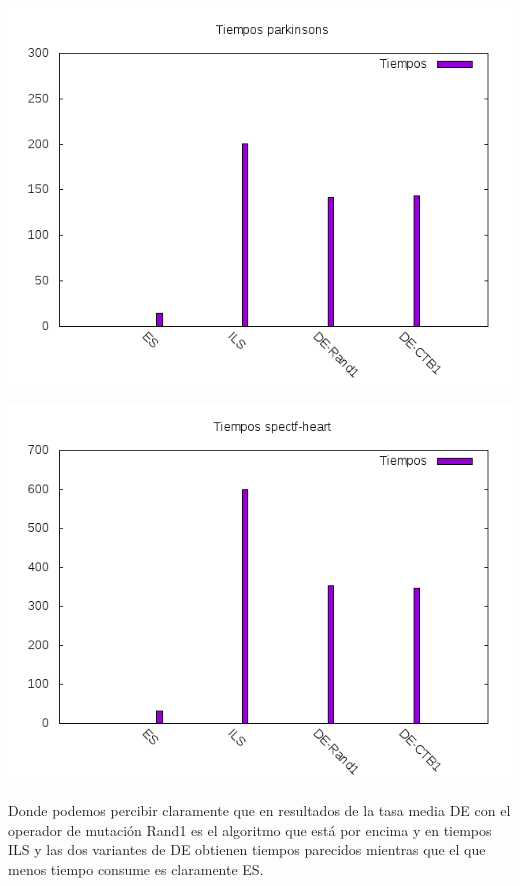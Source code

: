 \documentclass[12pt,a4paper]{article}
\begin{document}
	\includegraphics[scale=0.8]{./Imagenes/Tiempos/tiempos_parkinsons.png}
	
	\includegraphics[scale=0.8]{./Imagenes/Tiempos/tiempos_spectf-heart.png}
	
	Donde podemos percibir claramente que en resultados de la tasa media DE con el operador de mutación Rand1 es el algoritmo que está por encima y en tiempos ILS y las dos variantes de DE obtienen tiempos parecidos mientras que el que menos tiempo consume es claramente ES.
\end{document}
